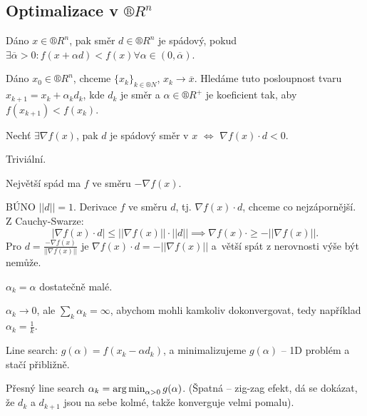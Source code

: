 \documentclass[12pt]{article}					%
\begin{document}
	\subsection{Optimalizace v $®R^n$}
	\begin{definice}
		Dáno $x \in ®R^n$, pak směr $d \in ®R^n$ je spádový, pokud $\exists \overline{\alpha} > 0: f(x + \alpha d) < f(x) \forall \alpha \in (0, \overline{\alpha})$.
	\end{definice}

	\begin{definice}
		Dáno $x_0 \in ®R^n$, chceme $\{x_k\}_{k \in ®N}$, $x_k \rightarrow \overline{x}$. Hledáme tuto posloupnost tvaru $x_{k+1} = x_k + \alpha_k d_k$, kde $d_k$ je směr a $\alpha \in ®R^+$ je koeficient tak, aby $f(x_{k+1}) < f(x_k)$.
	\end{definice}

	\begin{lemma}
		Nechť $\exists \nabla f(x)$, pak $d$ je spádový směr v $x$ $\Leftrightarrow$ $\nabla f(x)·d < 0$.

		\begin{dukazin}
			Triviální.
		\end{dukazin}
	\end{lemma}

	\begin{lemma}
		Největší spád ma $f$ ve směru $- \nabla f(x)$.

		\begin{dukazin}
			BÚNO $||d|| = 1$. Derivace $f$ ve směru $d$, tj. $\nabla f(x)·d$, chceme co nejzápornější. Z Cauchy-Swarze:
			$$ |\nabla f(x)·d| ≤ ||\nabla f(x)||·||d|| \implies \nabla f(x)· ≥ - ||\nabla f(x)||. $$
			Pro $d = \frac{-\nabla f(x)}{||\nabla f(x)||}$ je $\nabla f(x)·d = - ||\nabla f(x)||$ a větší spát z nerovnosti výše být nemůže.
		\end{dukazin}
	\end{lemma}
	
	\begin{poznamka}
		$\alpha_k = \alpha$ dostatečně malé.

		$\alpha_k \rightarrow 0$, ale $\sum_k \alpha_k = ∞$, abychom mohli kamkoliv dokonvergovat, tedy například $\alpha_k = \frac{1}{k}$.

		Line search: $g(\alpha) = f(x_k - \alpha d_k)$, a minimalizujeme $g(\alpha)$ – 1D problém a stačí přibližně.

		Přesný line search $\alpha_k = \operatorname{arg\,min}_{\alpha > 0} g(\alpha)$. (Špatná – zig-zag efekt, dá se dokázat, že $d_k$ a $d_{k+1}$ jsou na sebe kolmé, takže konverguje velmi pomalu).
	\end{poznamka}
\end{document}

